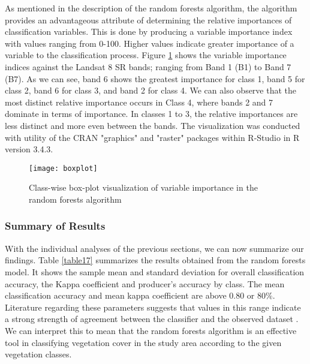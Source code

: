 \justify
As mentioned in the description of the random forests algorithm, the algorithm provides an advantageous attribute of determining the relative importances of classification variables. This is done by producing a variable importance index with values ranging from 0-100. Higher values indicate greater importance of a variable to the classification process. Figure \ref{fig21} shows the variable importance indices against the Landsat 8 SR bands; ranging from Band 1 (B1) to Band 7 (B7). As we can see, band 6 shows the greatest importance for class 1, band 5 for class 2, band 6 for class 3, and band 2 for class 4. We can also observe that the most distinct relative importance occurs in Class 4, where bands 2 and 7 dominate in terms of importance. In classes 1 to 3, the relative importances are less distinct and more even between the bands. The visualization was conducted with utility of the CRAN "graphics" and "raster" packages within R-Studio in R version 3.4.3.

\begin{figure}[H]
	\centering
	\texttt{[image: boxplot]}
	\caption{Class-wise box-plot visualization of variable importance in the random forests algorithm}
	\label{fig21}
\end{figure}

\subsubsection{Summary of Results}

\justify
With the individual analyses of the previous sections, we can now summarize our findings. Table \ref{table17} summarizes the results obtained from the random forests model. It shows the sample mean and standard deviation for overall classification accuracy, the Kappa coefficient and producer's accuracy by class. The mean classification accuracy and mean kappa coefficient are above 0.80 or 80$\%$. Literature regarding these parameters suggests that values in this range indicate a strong strength of agreement between the classifier and the observed dataset \citep{altman1990}. We can interpret this to mean that the random forests algorithm is an effective tool in classifying vegetation cover in the study area according to the given vegetation classes.


